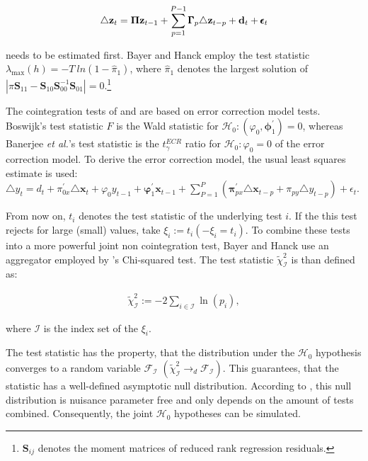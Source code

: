 \documentclass[12pt,a4paper]{article}
\let\rmarkdownfootnote\footnote%
\def\footnote{\protect\rmarkdownfootnote}
\begin{document}
\begin{align}
\triangle {\bf z}_t = {\bf \Pi z}_{t-1} + \sum^{P-1}_{p=1}\pmb{\Gamma}_p \triangle{\bf z}_{t-p} + {\bf d}_t + \pmb{\epsilon}_t
\end{align}

needs to be estimated first. Bayer and Hanck employ the test statistic
\(\lambda_{\max} (h) = - T \ ln(1 - \hat{\pi}_1)\), where
\(\hat{\pi}_1\) denotes the largest solution of
\(|\pi \pmb{S}_{11} - \pmb{S}_{10} \pmb{S}_{00}^{-1} \pmb{S}_{01}|= 0\).\footnote{\(\pmb{S}_{ij}\)
  denotes the moment matrices of reduced rank regression residuals.}

The cointegration tests of \textcite{Boswijk1994} and
\textcite{Banerjee1998} are based on error correction model tests.
Boswijk's test statistic \(\hat{F}\) is the Wald statistic for
\(\mathcal{H}_0: (\varphi_0, \pmb{\phi}_1^{'}) = 0\), whereas Banerjee
\emph{et al.}'s test statistic is the \(t_{\gamma}^{ECR}\) ratio for
\(\mathcal{H}_0 : \varphi_0 = 0\) of the error correction model. To
derive the error correction model, the usual least squares estimate is
used:
\(\triangle y_t = d_t + \pi_{0x}^{'} \triangle \pmb{x}_t + \varphi_0 y_{t-1} + \pmb{\varphi}_{1}^{'} \pmb{x}_{t-1} + \sum_{P = 1}^{P} \left( \pmb{\pi}_{px}^{'} \triangle \pmb{x}_{t-p} + \pi_{py} \triangle y_{t - p} \right) + \epsilon_t\).

From now on, \(t_i\) denotes the test statistic of the underlying test
\(i\). If the this test rejects for large (small) values, take
\(\xi_i := t_i (-\xi_i = t_i)\). To combine these tests into a more
powerful joint non cointegration test, Bayer and Hanck use an aggregator
employed by \textcite{Fisher1925}'s Chi-squared test. The test statistic
\(\tilde{\chi}_{\mathcal{I}}^2\) is than defined as:

\begin{align}
  \label{eq:bayer-hanck}
  \tilde{\chi}_{\mathcal{I}}^{2} := -2 \sum_{i \in \mathcal{I}} \ln(p_i),
\end{align}

where \(\mathcal{I}\) is the index set of the \(\xi_i\).

The test statistic has the property, that the distribution under the
\(\mathcal{H}_0\) hypothesis converges to a random variable
\(\mathcal{F}_{\mathcal{I}}\)
\(\left(\tilde{\chi}_{\mathcal{I}}^{2} \rightarrow_{d} \mathcal{F}_{\mathcal{I}} \right)\).
This guarantees, that the statistic has a well-defined asymptotic null
distribution. According to \textcite{Bayerhanck2009}, this null
distribution is nuisance parameter free and only depends on the amount
of tests combined. Consequently, the joint \(\mathcal{H_0}\) hypotheses
can be simulated.
\end{document}
